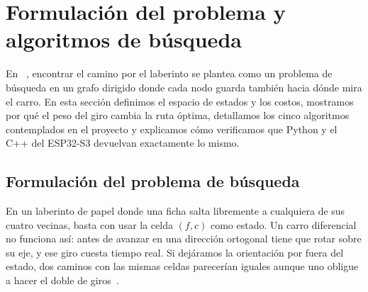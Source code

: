 \section{Formulación del problema y algoritmos de búsqueda}
\label{sec:algoritmos}

En ~\cite{repo2026agentelaberinto}, encontrar el camino por el laberinto se plantea como un problema de búsqueda en un grafo dirigido donde cada nodo guarda también hacia dónde mira el carro. En esta sección definimos el espacio de estados y los costos, mostramos por qué el peso del giro cambia la ruta óptima, detallamos los cinco algoritmos contemplados en el proyecto y explicamos cómo verificamos que Python y el C++ del ESP32-S3 devuelvan exactamente lo mismo.

\subsection{Formulación del problema de búsqueda}
\label{subsec:formulacion-problema}

En un laberinto de papel donde una ficha salta libremente a cualquiera de sus cuatro vecinas, basta con usar la celda $(f, c)$ como estado. Un carro diferencial no funciona así: antes de avanzar en una dirección ortogonal tiene que rotar sobre su eje, y ese giro cuesta tiempo real. Si dejáramos la orientación por fuera del estado, dos caminos con las mismas celdas parecerían iguales aunque uno obligue a hacer el doble de giros~\cite{arquitectura2026doc}.


